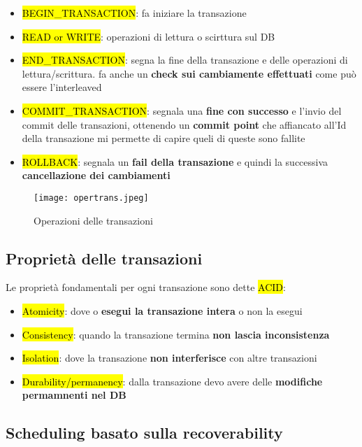 \begin{itemize}
    \item \hl{BEGIN\_TRANSACTION}: fa iniziare la transazione
    \item \hl{READ or WRITE}: operazioni di lettura o scirttura sul DB
    \item \hl{END\_TRANSACTION}: segna la fine della transazione e delle operazioni di lettura/scrittura. fa anche un \textbf{check sui cambiamente effettuati} come può essere l'interleaved
    \item \hl{COMMIT\_TRANSACTION}: segnala una \textbf{fine con successo} e l'invio del commit delle transazioni, ottenendo un \textbf{commit point} che affiancato all'Id della transazione mi permette di capire queli di queste sono fallite
    \item \hl{ROLLBACK}: segnala un \textbf{fail della transazione} e quindi la successiva \textbf{cancellazione dei cambiamenti}
\end{itemize}

\begin{figure}[H]
\centering
\texttt{[image: opertrans.jpeg]}
\caption{Operazioni delle transazioni} 
\label{opertrans}
\end{figure}


\subsection{Proprietà delle transazioni}

Le proprietà fondamentali per ogni transazione sono dette \hl{ACID}:

\begin{itemize}
    \item \hl{Atomicity}: dove o \textbf{esegui la transazione intera} o non la esegui
    \item \hl{Consistency}: quando la transazione termina \textbf{non lascia inconsistenza}
    \item \hl{Isolation}: dove la transazione \textbf{non interferisce} con altre transazioni
    \item \hl{Durability/permanency}: dalla transazione devo avere delle \textbf{modifiche permamnenti nel DB}
\end{itemize}


\subsection{Scheduling basato sulla recoverability}

